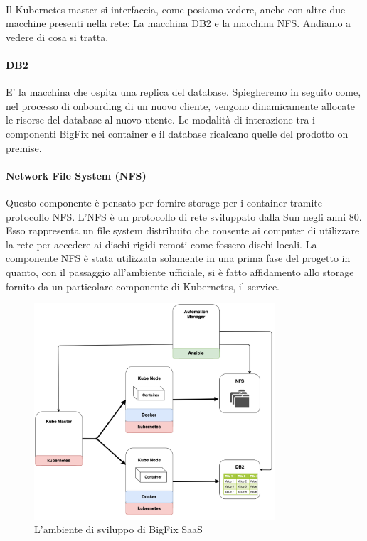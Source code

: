 \paragraph{}
Il Kubernetes master si interfaccia, come posiamo vedere, anche con altre due macchine presenti nella rete: La macchina DB2 e la macchina NFS. Andiamo a vedere di cosa si tratta.
\paragraph{DB2}
E' la macchina che ospita una replica del database. Spiegheremo in seguito come, nel processo di onboarding di un nuovo cliente, vengono dinamicamente allocate le risorse del database al nuovo utente. Le modalità di interazione tra i componenti BigFix nei container e il database ricalcano quelle del prodotto on premise.
\paragraph{Network File System (NFS)}
Questo componente è pensato per fornire storage per i container tramite protocollo NFS. L'NFS è un protocollo di rete sviluppato dalla Sun negli anni 80. Esso rappresenta un file system distribuito che consente ai computer di utilizzare la rete per accedere ai dischi rigidi remoti come fossero dischi locali. La componente NFS è stata utilizzata solamente in una prima fase del progetto in quanto, con il passaggio all'ambiente ufficiale, si è fatto affidamento allo storage fornito da un particolare componente di Kubernetes, il service. 

\begin{figure}[h!]
	\centering
	\includegraphics[width=0.8\textwidth,keepaspectratio=true]{capitoli/imgs/EnvironmentsComponentDiagram.png}
	\caption{L'ambiente di sviluppo di BigFix SaaS}
	\label{ambs}
\end{figure}


